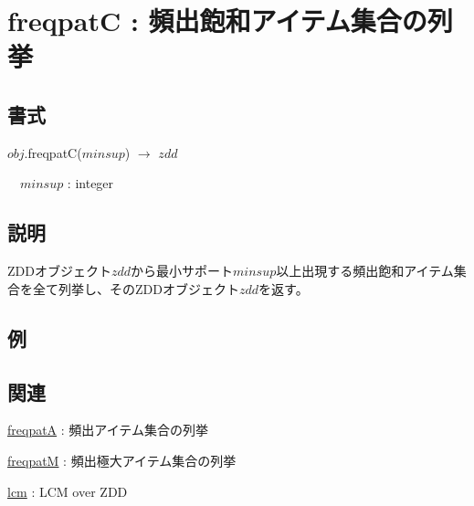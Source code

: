 
\section{freqpatC : 頻出飽和アイテム集合の列挙\label{sect:freqpatC}}
\subsection*{書式}
$obj$.freqpatC($minsup$) $\rightarrow$ $zdd$ 

~~$minsup$ : integer

\subsection*{説明}
ZDDオブジェクト$zdd$から最小サポート$minsup$以上出現する頻出飽和アイテム集合を全て列挙し、そのZDDオブジェクト$zdd$を返す。

\subsection*{例}


\subsection*{関連}
\hyperref[sect:freqpatA]{freqpatA} : 頻出アイテム集合の列挙

\hyperref[sect:freqpatM]{freqpatM} : 頻出極大アイテム集合の列挙

\hyperref[sect:lcm]{lcm} : LCM over ZDD
